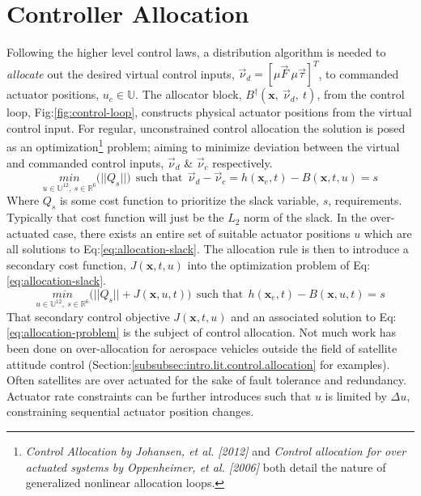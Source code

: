 {\section{Controller Allocation}
\label{sec:control.allocation}
Following the higher level control laws, a distribution algorithm is needed to \emph{allocate} out the desired virtual control inputs, $\vec{\nu}_d=[\mu\vec{F}~\mu\vec{\tau}]^T$, to commanded actuator positions, $u_c\in\mathbb{U}$. The allocator block, $B^\dagger(\mathbf{x},~\vec{\nu}_d,~t)$, from the control loop, Fig:\ref{fig:control-loop}, constructs physical actuator positions from the virtual control input. For regular, unconstrained control allocation the solution is posed as an optimization\footnote{\emph{Control Allocation by Johansen, et al. [2012]\cite{allocation}} and \emph{Control allocation for over actuated systems by Oppenheimer, et al. [2006]\cite{controlallocation}} both detail the nature of generalized nonlinear allocation loops.} problem; aiming to minimize deviation between the virtual and commanded control inputs, $\vec{\nu}_d$ \& $\vec{\nu}_c$ respectively.
\begin{equation}\label{eq:allocation-slack}
\underset{u\in\mathbb{U}^{12},~s\in\mathbb{R}^{6}}{min}\big(||Q_s||\big)~~\text{such that}~~\vec{\nu}_d-\vec{\nu}_c=h(\mathbf{x}_e,t)-B(\mathbf{x},t,u)=s
\end{equation}
Where $Q_s$ is some cost function to prioritize the slack variable, $s$, requirements. Typically that cost function will just be the $L_2$ norm of the slack. In the over-actuated case, there exists an entire set of suitable actuator positions $u$ which are all solutions to Eq:\ref{eq:allocation-slack}. The allocation rule is then to introduce a secondary cost function, $J(\mathbf{x},t,u)$ into the optimization problem of Eq:\ref{eq:allocation-slack}.
\begin{equation}\label{eq:allocation-problem}
\underset{u\in\mathbb{U}^{12},~s\in\mathbb{R}^{6}}{min}\big(||Q_s||+J(\mathbf{x},u,t)\big)~~\text{such that}~~h(\mathbf{x}_e,t)-B(\mathbf{x},u,t)=s
\end{equation}
That secondary control objective $J(\mathbf{x},t,u)$ and an associated solution to Eq:\ref{eq:allocation-problem} is the subject of control allocation. Not much work has been done on over-allocation for aerospace vehicles outside the field of satellite attitude control (Section:\ref{subsubsec:intro.lit.control.allocation} for examples). Often satellites are over actuated for the sake of fault tolerance and redundancy\cite{FTCallocation,discreteFTC}. Actuator rate constraints can be further introduces such that $u$ is limited by $\Delta u$, constraining sequential actuator position changes.
}
